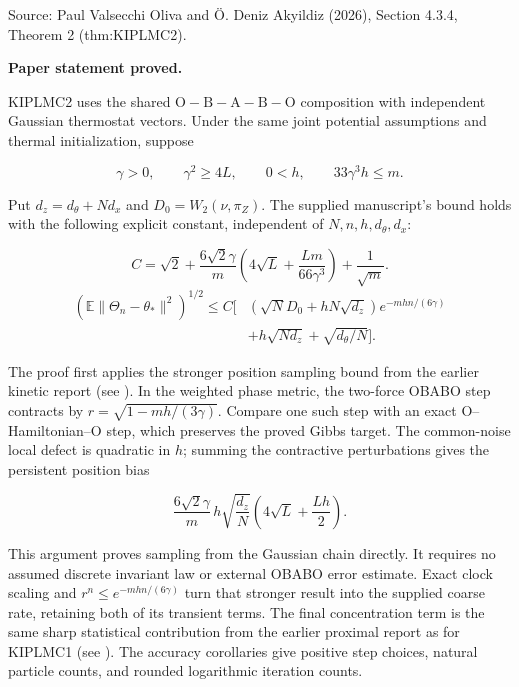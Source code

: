 \documentclass[11pt,a4paper]{report}
\begin{document}
Source: Paul Valsecchi Oliva and Ö. Deniz Akyildiz (2026), Section 4.3.4, Theorem 2 (thm:KIPLMC2).



\textbf{Paper statement proved.}



KIPLMC2 uses the shared \(\mathrm O-\mathrm B-\mathrm A-\mathrm B-\mathrm O\) composition with independent Gaussian thermostat vectors. Under the same joint potential assumptions and thermal initialization, suppose


\[\gamma>0,\qquad \gamma^2\ge4L,\qquad0<h,\qquad33\gamma^3h\le m.\]


Put \(d_z=d_\theta+Nd_x\) and \(D_0=W_2(\nu,\pi_Z)\). The supplied manuscript’s bound holds with the following explicit constant, independent of \(N,n,h,d_\theta,d_x\):


\[C=\sqrt2+\frac{6\sqrt2\gamma}{m}\left(4\sqrt L+\frac{Lm}{66\gamma^3}\right)+\frac1{\sqrt m}.\]
\[\boxed{\begin{aligned}(\mathbb E\|\Theta_n-\theta_*\|^2)^{1/2}\le C\bigl[&(\sqrt N D_0+hN\sqrt{d_z})e^{-mhn/(6\gamma)}\\&+h\sqrt{Nd_z}+\sqrt{d_\theta/N}\bigr].\end{aligned}}\]


The proof first applies the stronger position sampling bound from the earlier kinetic report (see \cite[Section~3.123.4]{LangevinLean2026Kinetic}). In the weighted phase metric, the two-force OBABO step contracts by \(r=\sqrt{1-mh/(3\gamma)}\). Compare one such step with an exact \(\mathrm O\)–Hamiltonian–\(\mathrm O\) step, which preserves the proved Gibbs target. The common-noise local defect is quadratic in \(h\); summing the contractive perturbations gives the persistent position bias


\[\frac{6\sqrt2\gamma}{m}\,h\sqrt{\frac{d_z}{N}}\left(4\sqrt L+\frac{Lh}{2}\right).\]


This argument proves sampling from the Gaussian chain directly. It requires no assumed discrete invariant law or external OBABO error estimate. Exact clock scaling and \(r^n\le e^{-mhn/(6\gamma)}\) turn that stronger result into the supplied coarse rate, retaining both of its transient terms. The final concentration term is the same sharp statistical contribution from the earlier proximal report as for KIPLMC1 (see \cite[Section~3.6.1]{LangevinLean2026Proximal}). The accuracy corollaries give positive step choices, natural particle counts, and rounded logarithmic iteration counts.
\end{document}
